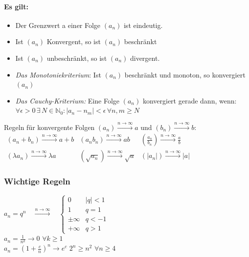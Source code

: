 \documentclass[6pt,a4paper]{scrartcl}
\newcommand{\abs}[1]{\ensuremath{\left\vert#1\right\vert}}
\newcommand{\N}{\ensuremath{\mathbb N}}
\begin{document}
\begin{multicols}{4}
\paragraph{Es gilt:}
\begin{itemize}\itemsep0pt
\item Der Grenzwert a einer Folge $(a_n)$ ist eindeutig.
\item Ist $(a_n)$ Konvergent, so ist $(a_n)$ beschränkt
\item Ist $(a_n)$ unbeschränkt, so ist $(a_n)$ divergent.
\item \emph{Das Monotoniekriterium}: Ist $(a_n)$ beschränkt und monoton, so konvergiert $(a_n)$
\item \emph{Das Cauchy-Kriterium:} Eine Folge $(a_n)$ konvergiert gerade dann, wenn: \\ $\forall \epsilon >0 \, \exists \,  N \in \N_0: \abs{a_n - n_m} < \epsilon \, \forall n, m \ge N$
\end{itemize}
Regeln für konvergente Folgen $(a_n) \overset{n \rightarrow \infty}{\longrightarrow} a$ und $(b_n) \overset{n \rightarrow \infty}{\longrightarrow} b$:\\
$\begin{array}{lll}
(a_n+b_n) \overset{n \rightarrow \infty}{\longrightarrow} a+b & (a_n b_n) \overset{n \rightarrow \infty}{\longrightarrow} ab & (\frac{a_n}{b_n}) \overset{n \rightarrow \infty}{\longrightarrow} \frac{a}{b}\\
(\lambda a_n) \overset{n \rightarrow \infty}{\longrightarrow} \lambda a & (\sqrt{a_n}) \overset{n \rightarrow \infty}{\longrightarrow} \sqrt{a} & (|a_n|) \overset{n \rightarrow \infty}{\longrightarrow} |a|
\end{array}$

\subsubsection{Wichtige Regeln}
$a_n=q^n \quad \overset{n \rightarrow \infty}{\longrightarrow} \quad \begin{cases} 0 & |q|<1 \\ 1 & q=1 \\ \pm \infty & q < -1  \\  + \infty & q > 1\end{cases}$ \\
$a_n=\frac{1}{n^k}\rightarrow 0$ \qquad $\forall k \ge 1$\\ 
$a_n=\left(1+\frac{c}{n}\right)^n \rightarrow e^c$ \qquad \qquad \qquad $2^n \ge n^2$ \quad $\forall n\ge 4$






\end{multicols}
\end{document}

